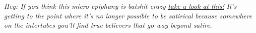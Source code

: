 \medskip

\emph{Hey: If you think this micro-epiphany is batshit crazy}
\href{https://endtimesforecaster.blogspot.com/2018/01/the-rapture-theorem-proving-blood-moon.html}{\emph{take
a look at this!}} \emph{It's getting to the point where it's no longer
possible to be satirical because somewhere on the intertubes you'll find
true believers that go way beyond satire.}


%
%
%



%

